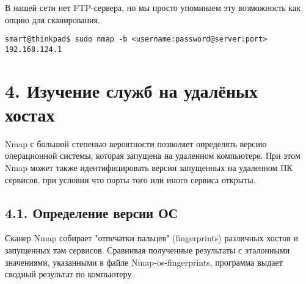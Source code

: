 В нашей сети нет FTP-сервера, но мы просто упоминаем эту возможность как опцию для сканирования.

\begin{Verbatim}[frame=single,breaklines=true,breakanywhere=true]
    smart@thinkpad$ sudo nmap -b <username:password@server:port> 192.168.124.1
\end{Verbatim}

\section*{4. Изучение служб на удалёных хостах}

Nmap с большой степенью вероятности позволяет определять версию операционной системы, которая запущена на удаленном компьютере. При этом Nmap может также идентифицировать версии запущенных на удаленном ПК сервисов, при условии что порты того или иного сервиса открыты.

\subsection*{4.1. Определение версии ОС}

Сканер Nmap собирает "отпечатки пальцев" (fingerprints) различных хостов и запущенных там сервисов. Сравнивая полученные результаты с эталонными значениями, указанными в файле Nmap-os-fingerprints, программа выдает сводный результат по компьютеру.

